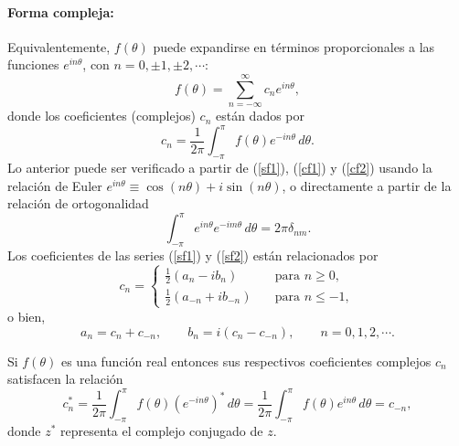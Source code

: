 \paragraph{Forma compleja:}
Equivalentemente, $f(\theta)$ puede expandirse en términos proporcionales a las funciones $e^{i n\theta}$, con $n=0,\pm 1,\pm 2, \cdots$:
\begin{equation}\label{sf2}
f(\theta)=\sum_{n=-\infty}^\infty c_n e^{i n\theta},
\end{equation}
donde los coeficientes (complejos) $c_n$ están dados por
\begin{equation}
c_n =\frac{1}{2\pi}\int_{-\pi}^\pi f(\theta) e^{-in\theta}\,d\theta .
\end{equation}
Lo anterior puede ser verificado a partir de (\ref{sf1}), (\ref{cf1}) y (\ref{cf2}) usando la relación de Euler $e^{in\theta}\equiv\cos(n\theta)+i\sin(n\theta)$, o directamente a partir de la relación de ortogonalidad
\begin{equation}
\int_{-\pi}^\pi e^{i n\theta} e^{-i m \theta}\,d\theta =2\pi\delta_{nm}.
\end{equation}
Los coeficientes de las series (\ref{sf1}) y (\ref{sf2}) están relacionados por
\begin{equation}c_n = 
\begin{cases}
\frac{1}{2}(a_n - i b_n)\quad &\text{para } n\geq 0,\\
\frac{1}{2}(a_{-n} + i b_{-n})\quad &\text{para } n\leq -1,
\end{cases}
\end{equation} 
o bien,
\begin{equation}
a_n=c_n+c_{-n}, \qquad b_n=i(c_n-c_{-n}), \qquad n=0,1,2,\cdots .
\end{equation}

Si $f(\theta)$ es una función real entonces sus respectivos coeficientes complejos $c_n$ satisfacen la relación
\begin{equation}
c_n^\ast=\frac{1}{2\pi}\int_{-\pi}^\pi f(\theta)(e^{-in\theta})^\ast\,d\theta
=\frac{1}{2\pi}\int_{-\pi}^\pi f(\theta) e^{in\theta}\,d\theta=c_{-n},
\end{equation}
donde $z^\ast$ representa el complejo conjugado de $z$.

